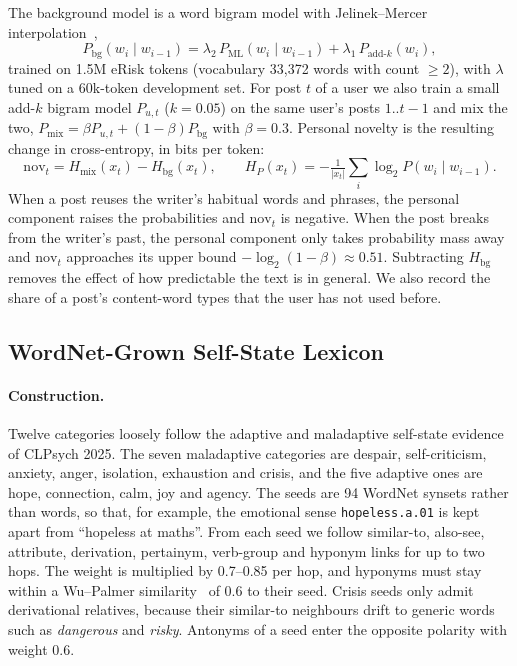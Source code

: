 \documentclass[runningheads]{llncs}
\begin{document}
The background model is a word bigram model with Jelinek--Mercer interpolation~\cite{jelinek1980interpolated,chen1999empirical},
\begin{equation}
P_{\text{bg}}(w_i \mid w_{i-1}) = \lambda_2\, P_{\text{ML}}(w_i \mid w_{i-1}) + \lambda_1\, P_{\text{add-}k}(w_i),
\end{equation}
trained on 1.5M eRisk tokens (vocabulary 33,372 words with count $\ge 2$), with $\lambda$ tuned on a 60k-token development set. For post $t$ of a user we also train a small add-$k$ bigram model $P_{u,t}$ ($k=0.05$) on the same user's posts $1..t-1$ and mix the two, $P_{\text{mix}} = \beta P_{u,t} + (1-\beta) P_{\text{bg}}$ with $\beta = 0.3$. Personal novelty is the resulting change in cross-entropy, in bits per token:
\begin{equation}
\mathrm{nov}_t = H_{\text{mix}}(x_t) - H_{\text{bg}}(x_t), \qquad H_{P}(x_t) = -\tfrac{1}{|x_t|}\textstyle\sum_i \log_2 P(w_i \mid w_{i-1}).
\end{equation}
When a post reuses the writer's habitual words and phrases, the personal component raises the probabilities and $\mathrm{nov}_t$ is negative. When the post breaks from the writer's past, the personal component only takes probability mass away and $\mathrm{nov}_t$ approaches its upper bound $-\log_2(1-\beta) \approx 0.51$. Subtracting $H_{\text{bg}}$ removes the effect of how predictable the text is in general. We also record the share of a post's content-word types that the user has not used before.

\subsection{WordNet-Grown Self-State Lexicon}

\paragraph{Construction.}
Twelve categories loosely follow the adaptive and maladaptive self-state evidence of CLPsych 2025. The seven maladaptive categories are despair, self-criticism, anxiety, anger, isolation, exhaustion and crisis, and the five adaptive ones are hope, connection, calm, joy and agency. The seeds are 94 WordNet synsets rather than words, so that, for example, the emotional sense \texttt{hopeless.a.01} is kept apart from ``hopeless at maths''. From each seed we follow similar-to, also-see, attribute, derivation, pertainym, verb-group and hyponym links for up to two hops. The weight is multiplied by 0.7--0.85 per hop, and hyponyms must stay within a Wu--Palmer similarity~\cite{wu1994verb} of 0.6 to their seed. Crisis seeds only admit derivational relatives, because their similar-to neighbours drift to generic words such as \emph{dangerous} and \emph{risky}. Antonyms of a seed enter the opposite polarity with weight 0.6.
\end{document}
